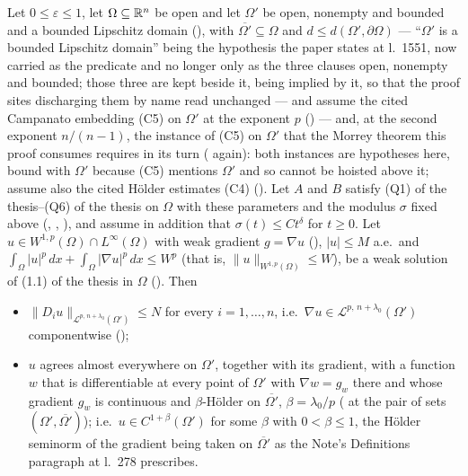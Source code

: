 \begin{theorem}[Theorem 6]
Let $0\le\varepsilon\le1$, let $\Omega\subseteq\mathbb{R}^n$ be open and let $\Omega'$ be
open, nonempty and bounded and a bounded Lipschitz domain
(), with $\overline{\Omega'}\subseteq\Omega$ and
$d\le d(\Omega',\partial\Omega)$ --- ``$\Omega'$ is a bounded Lipschitz domain'' being the hypothesis the paper states at l.~1551, now carried as the predicate  and no longer only as the three clauses open, nonempty and bounded; those three are kept beside it, being implied by it, so that the proof sites discharging them by name read unchanged ---
and assume the
cited Campanato embedding (C5) on $\Omega'$ at the exponent $p$
() --- and, at the second exponent
$n/(n-1)$, the instance of (C5) on $\Omega'$ that the Morrey theorem this proof
consumes requires in its turn ( again): both
instances are hypotheses here, bound with $\Omega'$ because (C5) mentions
$\Omega'$ and so cannot be hoisted above it; assume also the cited
H\"older estimates (C4) ().  Let $A$
and $B$ satisfy (Q1) of the thesis--(Q6) of the thesis on $\Omega$ with these parameters and
the modulus $\sigma$ fixed above (,
, ), and assume in
addition that $\sigma(t)\le Ct^{\delta}$ for $t\ge0$.  Let
$u\in W^{1,p}(\Omega)\cap L^\infty(\Omega)$ with weak gradient $g=\nabla u$
(), $|u|\le M$ a.e.\ and
$\int_\Omega|u|^p\,dx+\int_\Omega|\nabla u|^p\,dx\le W^p$ (that is,
$\|u\|_{W^{1,p}(\Omega)}\le W$), be a weak solution of
(1.1) of the thesis in $\Omega$ ().  Then
\begin{itemize}
\item[(i)] $\|D_iu\|_{\mathcal L^{p,\,n+\lambda_0}(\Omega')}\le N$ for every
  $i=1,\dots,n$, i.e.\ $\nabla u\in\mathcal L^{p,\,n+\lambda_0}(\Omega')$
  componentwise ();
\item[(ii)] $u$ agrees almost everywhere on $\Omega'$, together with its
  gradient, with a function $w$ that is differentiable at every point of
  $\Omega'$ with $\nabla w=g_w$ there and whose gradient $g_w$ is continuous and
  $\beta$-H\"older on $\overline{\Omega'}$, $\beta=\lambda_0/p$
  ( at the pair of sets $(\Omega',\overline{\Omega'})$);
  i.e.\ $u\in C^{1+\beta}(\Omega')$ for some $\beta$ with $0<\beta\le1$, the
  H\"older seminorm of the gradient being taken on $\overline{\Omega'}$ as the
  Note's Definitions paragraph at l.~278 prescribes.

\end{itemize}
\end{theorem}
